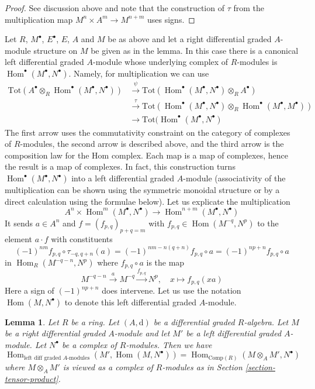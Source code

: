 \documentclass{stacks-project}
\theoremstyle{plain}
\newtheorem{lemma}[subsection]{Lemma}
\theoremstyle{definition}
\theoremstyle{remark}
\numberwithin{equation}{subsection}
\def\Hom{\mathop{\mathrm{Hom}}\nolimits}
\begin{document}
\begin{proof}
See discussion above and note that the construction of $\tau$
from the multiplication map $M^n \times A^m \to M^{n + m}$
uses signs.
\end{proof}

\noindent
Let $R$, $M^\bullet$, $E^\bullet$, $E$, $A$ and $M$ be as above
and let a right differential graded $A$-module structure on $M$
be given as in the lemma. In this case there is a canonical left
differential graded $A$-module whose underlying complex of $R$-modules is
$\Hom^\bullet(M^\bullet, N^\bullet)$. Namely, for multiplication
we can use
\begin{align*}
\text{Tot}(A^\bullet \otimes_R \Hom^\bullet(M^\bullet, N^\bullet))
& \xrightarrow{\psi}
\text{Tot}(\Hom^\bullet(M^\bullet, N^\bullet) \otimes_R A^\bullet) \\
& \xrightarrow{\tau}
\text{Tot}(\Hom^\bullet(M^\bullet, N^\bullet) \otimes_R
\Hom^\bullet(M^\bullet, M^\bullet)) \\
& \to
\text{Tot}(\Hom^\bullet(M^\bullet, N^\bullet)
\end{align*}
The first arrow uses the commutativity constraint on the category
of complexes of $R$-modules, the second arrow is described above, and
the third arrow is the composition law for the Hom complex.
Each map is a map of complexes, hence the result is a map of complexes.
In fact, this construction turns $\Hom^\bullet(M^\bullet, N^\bullet)$
into a left differential graded $A$-module (associativity of the multiplication
can be shown using the symmetric monoidal structure or by a direct calculation
using the formulae below). Let us explicate the multiplication
$$
A^n \times \Hom^m(M^\bullet, N^\bullet) \longrightarrow
\Hom^{n + m}(M^\bullet, N^\bullet)
$$
It sends $a \in A^n$ and
$f = (f_{p, q})_{p + q = m}$ with $f_{p, q} \in \Hom(M^{-q}, N^p)$
to the element $a \cdot f$ with constituents
$$
(-1)^{nm}f_{p, q} \circ \tau_{-q, q + n}(a) =
(-1)^{nm - n(q + n)}f_{p, q} \circ a =
(-1)^{np + n} f_{p, q} \circ a
$$
in $\Hom_R(M^{-q - n}, N^p)$ where $f_{p, q} \circ a$ is the map
$$
M^{-q - n} \xrightarrow{a} M^{-q} \xrightarrow{f_{p, q}} N^p,\quad
x \longmapsto f_{p, q}(xa)
$$
Here a sign of $(-1)^{np + n}$ does intervene.  Let us use the notation
$\Hom(M, N^\bullet)$ to denote this left differential graded $A$-module.

\begin{lemma}
\label{lemma-characterize-hom-other-side}
Let $R$ be a ring. Let $(A, \text{d})$ be a differential graded $R$-algebra.
Let $M$ be a right differential graded $A$-module and let
$M'$ be a left differential graded $A$-module.
Let $N^\bullet$ be a complex of $R$-modules. Then we have
$$
\Hom_{\text{left diff graded }A\text{-modules}}(M', \Hom(M, N^\bullet)) =
\Hom_{\text{Comp}(R)}(M \otimes_A M', N^\bullet)
$$
where $M \otimes_A M'$ is viewed as a complex of $R$-modules
as in Section \ref{section-tensor-product}.
\end{lemma}
\end{document}
